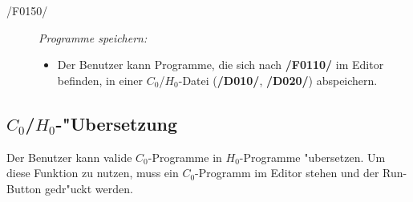 \begin{description}
    \item[/F0150/]
      \textit{Programme speichern:}
      \begin{itemize}
        \item Der Benutzer kann Programme, die sich nach \textbf{/F0110/} im
        Editor befinden, in einer $C_0$/$H_0$-Datei
        (\textbf{/D010/}, \textbf{/D020/}) abspeichern.
      \end{itemize}
  \end{description}
\newpage
\subsection{$C_0$/$H_0$-"Ubersetzung}
  Der Benutzer kann valide $C_0$-Programme in $H_0$-Programme "ubersetzen. Um
  diese Funktion zu nutzen, muss ein $C_0$-Programm im Editor stehen und der
  Run-Button gedr"uckt werden.
